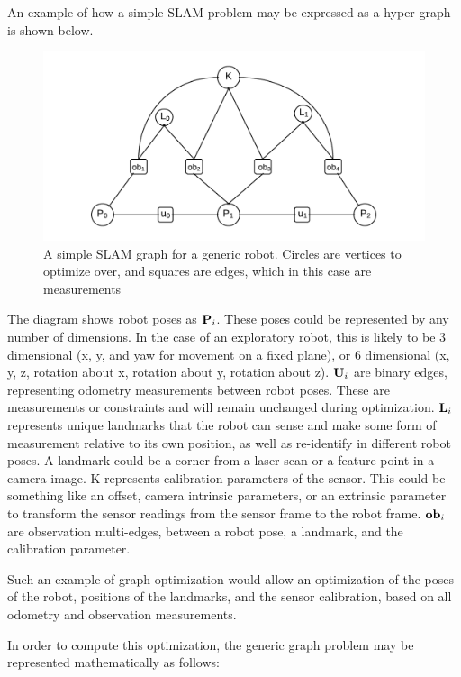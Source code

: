 An example of how a simple SLAM problem may be expressed as a hyper-graph is shown below.
\begin{figure}[h]
  \centering
      \includegraphics[width=1.0\textwidth]{chapters/images/simple_slam}
  \caption{A simple SLAM graph for a generic robot.  Circles are vertices to optimize over, and
squares are edges, which in this case are measurements}
\end{figure}

The diagram shows robot poses as $\mathbf P_i$.  These poses could be represented by any number of dimensions. In the case of an exploratory robot, this is likely to be 3 dimensional (x, y, and yaw for movement on a fixed plane), or 6 dimensional (x, y, z, rotation about x, rotation about y, rotation about z).  $\mathbf U_i$ are binary edges, representing odometry measurements between robot poses. These are measurements or constraints and will remain unchanged during optimization.  
$\mathbf L_i$ represents unique landmarks that the robot can sense and make some form of measurement relative to its own position, as well as re-identify in different robot poses.  A landmark could be a corner from a laser scan or a feature point in a camera image.  K represents calibration parameters of the sensor.  This could be something like an offset, camera intrinsic parameters, or an extrinsic parameter to transform the sensor readings from the sensor frame to the robot frame.  $\mathbf {ob}_i$ are observation multi-edges, between a robot pose, a landmark, and the calibration parameter.

Such an example of graph optimization would allow an optimization of the poses of the robot, positions of the landmarks, and the sensor calibration, based on all odometry and observation measurements.

In order to compute this optimization, the generic graph problem may be represented mathematically as follows:

